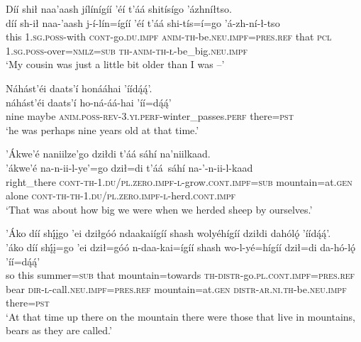 \ea\label{ex:text6-1-5}
Díí shił naa’aash jílínígíí ’éí t’áá shitísígo ’ázhníłtso.\\
\gll díí	sh-ił	naa-’aash	j-í-lín=ígíí	’éí	t’áá	shi-tís=í=go	’á-zh-ní-ł-tso\\
     this	1.\textsc{sg}.\textsc{poss}-with	\textsc{cont}-go.\textsc{du}.\textsc{impf}	\textsc{anim}-\textsc{th}-be.\textsc{neu}.\textsc{impf}=\textsc{pres}.\textsc{ref}	that	\textsc{pcl}	1.\textsc{sg}.\textsc{poss}-over=\textsc{nmlz}=\textsc{sub}	\textsc{th}-\textsc{anim}-\textsc{th}-\textsc{ł}-be\_big.\textsc{neu}.\textsc{impf}\\
\glt `My cousin was just a little bit older than I was --'
\z

\ea\label{ex:text6-1-6}
Náhást’éi daats’í honááhai ’íídą́ą́’.\\
\gll náhást’éi	daats’í	ho-ná-áá-hai	’íí=dą́ą́’\\
     nine	maybe	\textsc{anim}.\textsc{poss}-\textsc{rev}-3.\textsc{yi}.\textsc{perf}-winter\_passes.\textsc{perf}	there=\textsc{pst}\\
\glt `he was perhaps nine years old at that time.'
\z

\ea\label{ex:text6-1-7}
’Ákwe’é naniilze’go dziłdi t’áá sáhí na’niilkaad.\\
\gll ’ákwe’é	na-n-ii-l-ye’=go	dził=di	t’áá~{sáhí}	na-’-n-ii-l-kaad\\
     right\_there	\textsc{cont}-\textsc{th}-1.\textsc{du}/\textsc{pl}.\textsc{zero}.\textsc{impf}-\textsc{l}-grow.\textsc{cont}.\textsc{impf}=\textsc{sub}	mountain=at.\textsc{gen}	alone	\textsc{cont}-\textsc{th}-\textsc{th}-1.\textsc{du}/\textsc{pl}.\textsc{zero}.\textsc{impf}-\textsc{l}-herd.\textsc{cont}.\textsc{impf}\\
\glt `That was about how big we were when we herded sheep by ourselves.'
\z

\ea\label{ex:text6-2-1}
’Áko díí shį́įgo ’ei dziłgóó ndaakaiígíí shash wolyéhígíí dziłdi dahólǫ́ ’íídą́ą́’.\\
\gll ’áko	díí	shį́į=go	’ei	dził=góó	n-daa-kai=ígíí	shash	wo-l-yé=hígíí	dził=di	da-hó-lǫ́	’íí=dą́ą́’\\
     so	this	summer=\textsc{sub}	that	mountain=towards	\textsc{th}-\textsc{distr}-go.\textsc{pl}.\textsc{cont}.\textsc{impf}=\textsc{pres}.\textsc{ref}	bear	\textsc{dir}-\textsc{l}-call.\textsc{neu}.\textsc{impf}=\textsc{pres}.\textsc{ref}	mountain=at.\textsc{gen}	\textsc{distr}-\textsc{ar}.\textsc{ni}.\textsc{th}-be.\textsc{neu}.\textsc{impf}	there=\textsc{pst}\\
\glt `At that time up there on the mountain there were those that live in mountains, bears as they are called.'
\z

